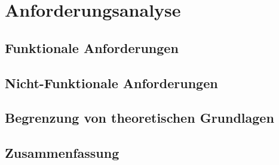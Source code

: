 \chapter{Anforderungsanalyse}
\section{Funktionale Anforderungen}
\section{Nicht-Funktionale Anforderungen}
\section{Begrenzung von theoretischen Grundlagen}
\section{Zusammenfassung}